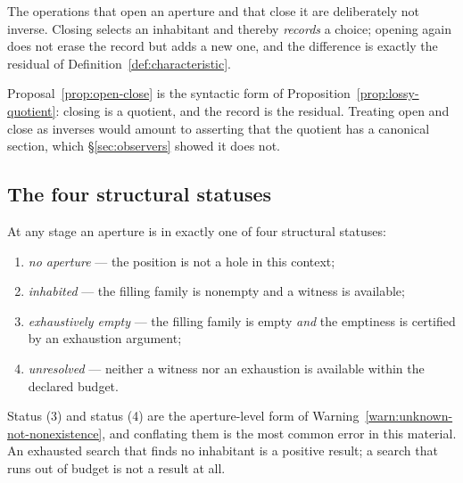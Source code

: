 \begin{proposal}\label{prop:open-close}
The operations that open an aperture and that close it are deliberately not inverse.
Closing selects an inhabitant and thereby \emph{records} a choice; opening again does not
erase the record but adds a new one, and the difference is exactly the residual of
Definition~\ref{def:characteristic}.
\end{proposal}

\begin{remark}
Proposal~\ref{prop:open-close} is the syntactic form of
Proposition~\ref{prop:lossy-quotient}: closing is a quotient, and the record is the
residual.  Treating open and close as inverses would amount to asserting that the
quotient has a canonical section, which \S\ref{sec:observers} showed it does not.
\end{remark}

\subsection{The four structural statuses}

\begin{definition}\label{def:aperture-status}
At any stage an aperture is in exactly one of four structural statuses:
\begin{enumerate}
\item \emph{no aperture} --- the position is not a hole in this context;
\item \emph{inhabited} --- the filling family is nonempty and a witness is available;
\item \emph{exhaustively empty} --- the filling family is empty \emph{and} the
  emptiness is certified by an exhaustion argument;
\item \emph{unresolved} --- neither a witness nor an exhaustion is available within the
  declared budget.
\end{enumerate}
\end{definition}

\begin{warning}\label{warn:empty-unresolved}
Status (3) and status (4) are the aperture-level form of
Warning~\ref{warn:unknown-not-nonexistence}, and conflating them is the most common error
in this material.  An exhausted search that finds no inhabitant is a positive result; a
search that runs out of budget is not a result at all.
\end{warning}

